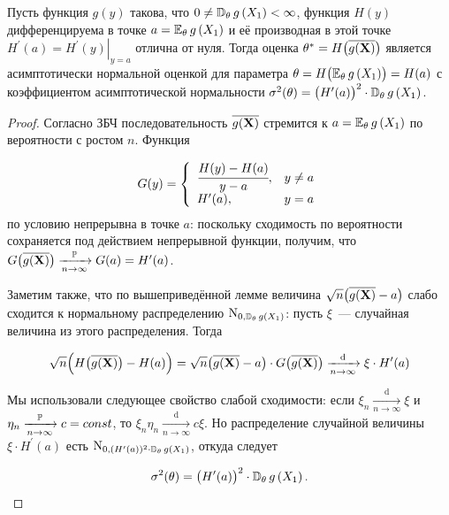 \begin{thm*}
    Пусть функция $g(y)$ такова, что $0 \neq \operatorname{\mathbb{D}_{\theta}} g\left(X_{1}\right)<\infty$, функция $H(y)$ дифференцируема в точке $a=\operatorname{\operatorname{\mathbb{E}}_{\theta}} g\left(X_{1}\right)$ и её производная в этой точке $H^{\prime}(a)=\left.H^{\prime}(y)\right|_{y=a}$ отлична от нуля. 
    Тогда оценка $\theta^{*}=H\bigl(\overline{g(\mathbf{X})}\bigr)$ является асимптотически нормальной оценкой для параметра $\theta = H\bigl(\operatorname{\operatorname{\mathbb{E}}_{\theta}} g\left(X_{1}\right)\bigr) = H(a)$ с коэффициентом асимптотической нормальности $\sigma^{2}(\theta)=\bigl(H^{\prime}(a)\bigr)^{2} \cdot \operatorname{\mathbb{D}_{\theta}} g\left(X_{1}\right)$.
\end{thm*}

\begin{proof}
    Согласно ЗБЧ последовательность $\overline{g(\mathbf{X})}$ стремится к $a=\operatorname{\operatorname{\mathbb{E}}_{\theta}} g\left(X_{1}\right)$ по вероятности с ростом $n$. Функция

    \begin{equation*}
        G(y)=\left\{\begin{array}{ll}
        \cfrac{H(y)-H(a)}{y-a}, & y \neq a \\
        H^{\prime}(a), & y=a
        \end{array}\right.  
    \end{equation*}
    по условию непрерывна в точке $a$: 
    поскольку сходимость по вероятности сохраняется под действием непрерывной функции, получим,
    что $G\bigl(\overline{g(\mathbf{X})}\bigr) \xrightarrow[n \to \infty]{\operatorname{\mathbb{P}}} G(a)=H^{\prime}(a)$.

    Заметим также, что по вышеприведённой лемме величина ${\sqrt{n}\bigl(\overline{g(\mathbf{X})} - a\bigr)}$ слабо сходится
    к нормальному распределению $\operatorname{\mathrm{N}}_{0, \operatorname{\mathbb{D}_{\theta}} g(X_{1})}$: 
    пусть $\xi$~--- случайная величина из этого распределения. Тогда

    \begin{equation*}
        \sqrt{n} \Bigl(H\bigl(\overline{g(\mathbf{X})}\bigr) - H(a)\Bigr) = 
        \sqrt{n} \bigl(\overline{g(\mathbf{X})} - a\bigr) \cdot G\bigl(\overline{g(\mathbf{X})}\bigr) 
        \xrightarrow[n \to \infty]{\text{d}} \xi \cdot H^{\prime}(a)
    \end{equation*}

    Мы использовали следующее свойство слабой сходимости: если $\xi_{n} \xrightarrow[n \to \infty]{\text{d}} \xi$ и $\eta_{n} \xrightarrow[n \to \infty]{\operatorname{\mathbb{P}}} c=const$, то $\xi_{n} \eta_{n} \xrightarrow[n \to \infty]{\text{d}} c \xi$.
    Но распределение случайной величины $\xi \cdot H^{\prime}(a)$ есть $\operatorname{\mathrm{N}}_{0,(H^{\prime}(a))^{2} \cdot \operatorname{\mathbb{D}_{\theta}} g(X_{1})}$, откуда следует

    \begin{equation*}
        \sigma^{2}(\theta)=\bigl(H^{\prime}(a)\bigr)^{2} \cdot \operatorname{\mathbb{D}_{\theta}} g\left(X_{1}\right). \qedhere
    \end{equation*}
\end{proof}
